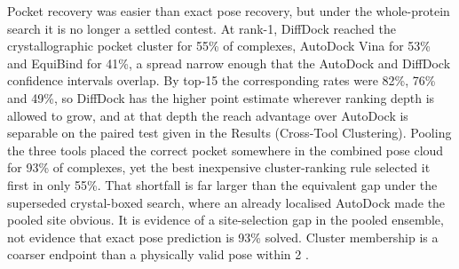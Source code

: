 Pocket recovery was easier than exact pose recovery, but under the whole-protein search it is no longer a settled contest. At rank-1, DiffDock reached the crystallographic pocket cluster for 55\% of complexes, AutoDock Vina for 53\% and EquiBind for 41\%, a spread narrow enough that the AutoDock and DiffDock confidence intervals overlap. By top-15 the corresponding rates were 82\%, 76\% and 49\%, so DiffDock has the higher point estimate wherever ranking depth is allowed to grow, and at that depth the reach advantage over AutoDock is separable on the paired test given in the Results (Cross-Tool Clustering). Pooling the three tools placed the correct pocket somewhere in the combined pose cloud for 93\% of complexes, yet the best inexpensive cluster-ranking rule selected it first in only 55\%. That shortfall is far larger than the equivalent gap under the superseded crystal-boxed search, where an already localised AutoDock made the pooled site obvious. It is evidence of a site-selection gap in the pooled ensemble, not evidence that exact pose prediction is 93\% solved. Cluster membership is a coarser endpoint than a physically valid pose within 2 \angstrom{}.

